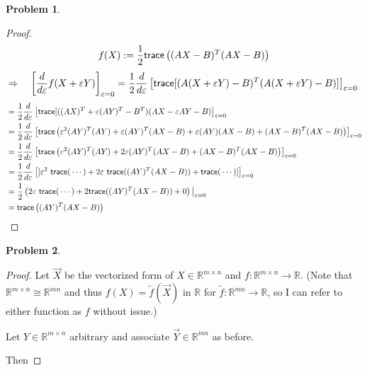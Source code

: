 \documentclass[10pt]{article}
\theoremstyle{plain}
\theoremstyle{definition}
\newtheorem{prob}{Problem}
\providecommand{\R}{\mathbb{R}}%
\providecommand{\tr}{{\sf trace}}%
\renewcommand{\tilde}[1]{\widetilde{#1}}%
\numberwithin{equation}{section}
\renewcommand{\epsilon}{\varepsilon}
\begin{document}
\begin{prob}
\end{prob}

\begin{proof}
\[
  f(X) := \frac{1}{2}\tr\left((AX-B)^T(AX-B)\right)
\]
\[
  \Rightarrow \quad   
  \left[ \frac{d}{d \epsilon} f(X + \epsilon Y) \right]_{\epsilon=0} 
  = \frac{1}{2} \frac{d}{d \epsilon} \left[ \tr[ ( A (X+ \epsilon Y ) - B)^T ( A ( X + \epsilon Y ) - B)]\right]_{\epsilon=0} \\
\]
\[
\begin{aligned}
  &= \frac{1}{2} \frac{d}{d \epsilon} \left[ \tr[ ( (AX)^T + \epsilon (AY)^T - B^T ) ( AX - \epsilon AY -B ) \right]_{\epsilon=0} \\
  &= \frac{1}{2} \frac{d}{d \epsilon} \left[ \tr\left( \epsilon^2 (AY)^T(AY)
          + \epsilon (AY)^T (AX-B)
          + \epsilon (AY) (AX-B)
          + (AX-B)^T (AX-B) \right)\right]_{\epsilon=0} \\
  &= \frac{1}{2} \frac{d}{d \epsilon} \left[ \tr\left( \epsilon^2 (AY)^T(AY)
          +  2 \epsilon (AY)^T (AX-B)
          + (AX-B)^T (AX-B) \right)\right]_{\epsilon=0} \\
  &= \frac{1}{2} \frac{d}{d \epsilon} \left[ [ \epsilon^2 \ \tr( \, \cdots \, )
          + 2 \epsilon \ \tr( (AY)^T (AX-B) )
          + \tr( \, \cdots \, )]\right]_{\epsilon=0} \\
  &= \frac{1}{2} \left( 2 \epsilon \ \tr( \, \cdots \, ) + 2 \tr( (AY)^T (AX -B)) + 0 \right) \big|_{\epsilon=0} \\
  &= \tr \left( (AY)^T (AX - B) \right) \\
\end{aligned}
\]
\end{proof}

\begin{prob}
\end{prob}

\begin{proof}
  Let $\vec{X}$ be the vectorized form of $X \in \R^{m \times n}$
  and $f: \R^{m \times n} \rightarrow \R$.
  (Note that $\R^{m \times n} \cong \R^{mn}$ and thus
  $f(X) = \tilde{f}(\vec{X})$ in $\R $ for $ \tilde{f}:\R^{mn} \rightarrow \R$,
  so I can refer to either function as $f$ without issue.)

  Let $Y \in \R^{m \times n}$ arbitrary
  and associate $\vec{Y} \in \R^{mn} $ as before.

  Then


\end{proof}
\end{document}
